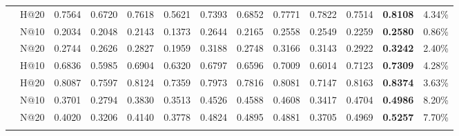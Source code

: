 \documentclass[conference]{IEEEtran}
\begin{document}
\begin{table*}[t]
\begin{tabular}{Y|c|BBBBBBB||DDD|c}
		& H@20    & 0.7564 & 0.6720  & 0.7618 & 0.5621 & 0.7393 & 0.6852 & 0.7771 & 0.7822         & 0.7514       & \textbf{0.8108}  & 4.34\%    \\
		& N@10    & 0.2034 & 0.2048 & 0.2143 & 0.1373 & 0.2644 & 0.2165 & 0.2558 & 0.2549         & 0.2259       & \textbf{0.2580}   & 0.86\%    \\
		& N@20    & 0.2744 & 0.2626 & 0.2827 & 0.1959 & 0.3188 & 0.2748 & 0.3166 & 0.3143         & 0.2922       & \textbf{0.3242 } & 2.40\%    \\
		\specialrule{.1em}{.1em}{.1em}
		&H@10    & 0.6836      & 0.5985      & 0.6904      & 0.6320      & 0.6797      & 0.6596      & 0.7009      & 0.6014   & 0.7123            & \textbf{0.7309}       & 4.28\%       \\
		&H@20 &0.8087&0.7597&0.8124&0.7359&0.7973&0.7816&0.8081&0.7147&0.8163& \textbf{0.8374}& 3.63\%       \\
		&N@10    & 0.3701      & 0.2794      & 0.3830      & 0.3513      & 0.4526      & 0.4588      & 0.4608      & 0.3417   & 0.4704            & \textbf{0.4986}       & 8.20\%       \\
		&N@20    & 0.4020      & 0.3206      & 0.4140      & 0.3778      & 0.4824      & 0.4895      & 0.4881      & 0.3705   & 0.4969            & \textbf{0.5257}       & 7.70\%      \\
		\specialrule{.1em}{.1em}{.1em}
	\end{tabular}
\vspace{-1ex}
\end{table*}
\end{document}
